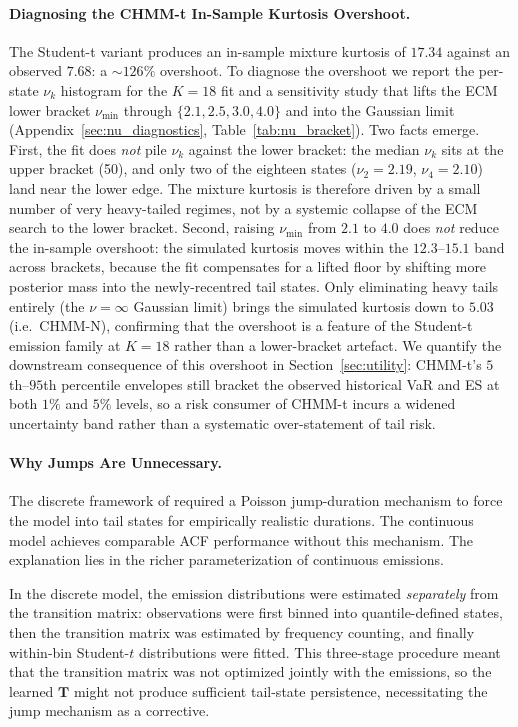 \paragraph{Diagnosing the CHMM-t In-Sample Kurtosis Overshoot.}
The Student-t variant produces an in-sample mixture kurtosis of $17.34$ against an observed $7.68$: a $\sim 126\%$ overshoot.
To diagnose the overshoot we report the per-state $\nu_k$ histogram for the $K = 18$ fit and a sensitivity study that lifts the ECM lower bracket $\nu_{\min}$ through $\{2.1, 2.5, 3.0, 4.0\}$ and into the Gaussian limit (Appendix~\ref{sec:nu_diagnostics}, Table~\ref{tab:nu_bracket}).
Two facts emerge.
First, the fit does \emph{not} pile $\nu_k$ against the lower bracket: the median $\nu_k$ sits at the upper bracket (50), and only two of the eighteen states ($\nu_2 = 2.19$, $\nu_4 = 2.10$) land near the lower edge.
The mixture kurtosis is therefore driven by a small number of very heavy-tailed regimes, not by a systemic collapse of the ECM search to the lower bracket.
Second, raising $\nu_{\min}$ from $2.1$ to $4.0$ does \emph{not} reduce the in-sample overshoot: the simulated kurtosis moves within the $12.3$--$15.1$ band across brackets, because the fit compensates for a lifted floor by shifting more posterior mass into the newly-recentred tail states.
Only eliminating heavy tails entirely (the $\nu = \infty$ Gaussian limit) brings the simulated kurtosis down to $5.03$ (i.e.\ CHMM-N), confirming that the overshoot is a feature of the Student-t emission family at $K = 18$ rather than a lower-bracket artefact.
We quantify the downstream consequence of this overshoot in Section~\ref{sec:utility}: CHMM-t's $5$th--$95$th percentile envelopes still bracket the observed historical VaR and ES at both $1\%$ and $5\%$ levels, so a risk consumer of CHMM-t incurs a widened uncertainty band rather than a systematic over-statement of tail risk.

\paragraph{Why Jumps Are Unnecessary.}
The discrete framework of \citet{alswaidan2026hybrid} required a Poisson jump-duration mechanism to force the model into tail states for empirically realistic durations.
The continuous model achieves comparable ACF performance without this mechanism.
The explanation lies in the richer parameterization of continuous emissions.

In the discrete model, the emission distributions were estimated \emph{separately} from the transition matrix: observations were first binned into quantile-defined states, then the transition matrix was estimated by frequency counting, and finally within-bin Student-$t$ distributions were fitted.
This three-stage procedure meant that the transition matrix was not optimized jointly with the emissions, so the learned $\mathbf{T}$ might not produce sufficient tail-state persistence, necessitating the jump mechanism as a corrective.

